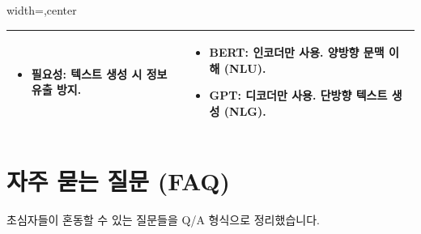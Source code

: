 \documentclass[11pt,a4paper]{article}
\theoremstyle{definition}
\begin{document}
\begin{adjustbox}{width=\textwidth,center}
\begin{tabular}{p{}p{}}
\begin{tcolorbox}[mybox, title={마스크드 어텐션}]
\begin{itemize}
    \item \textbf{필요성:} 텍스트 생성 시 정보 유출 방지.
\end{itemize}
\end{tcolorbox}
&
\begin{tcolorbox}[mybox, title={트랜스포머의 활용}]
\begin{itemize}
    \item \textbf{BERT:} 인코더만 사용. 양방향 문맥 이해 (NLU).
    \item \textbf{GPT:} 디코더만 사용. 단방향 텍스트 생성 (NLG).
\end{itemize}
\end{tcolorbox} \\
\bottomrule
\end{tabular}
\end{adjustbox}

\newpage
\section{자주 묻는 질문 (FAQ)}
초심자들이 혼동할 수 있는 질문들을 Q/A 형식으로 정리했습니다.
\end{document}
